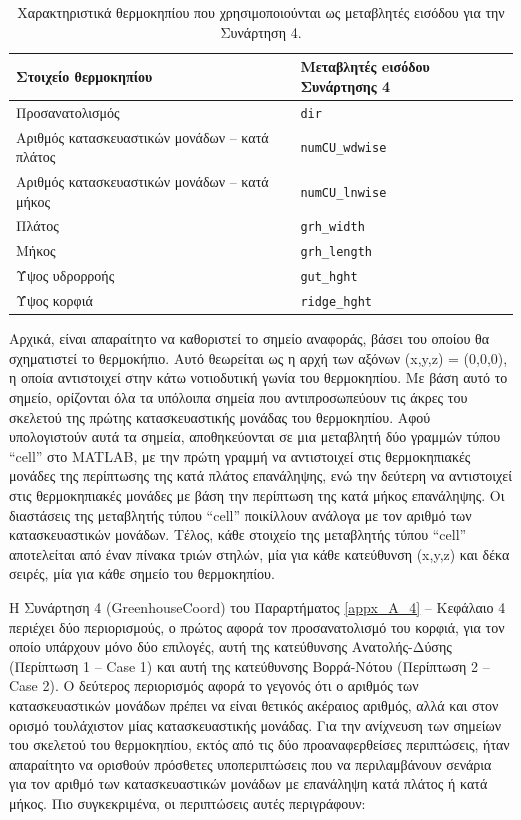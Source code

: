 \documentclass[12pt, a4paper]{report} %
\newcommand{\english}{\foreignlanguage{english}}
\begin{document}
\begin{table}[ht]
    \centering
    \caption{Χαρακτηριστικά θερμοκηπίου που χρησιμοποιούνται ως μεταβλητές εισόδου για την Συνάρτηση 4.}\label{tab_fnc_4_inputs} 
        \begin{tabular}{>{\centering\arraybackslash}m{7.5cm} >{\centering\arraybackslash}m{7.5cm}}
        \toprule
        \textbf{Στοιχείο θερμοκηπίου} & \textbf{Mεταβλητές eισόδου Συνάρτησης 4} \\
        \midrule
        Προσανατολισμός & \texttt{\english{dir}} \\
        Αριθμός κατασκευαστικών μονάδων – κατά πλάτος & \texttt{\english{numCU\_wdwise}} \\ 
        Αριθμός κατασκευαστικών μονάδων – κατά μήκος & \texttt{\english{numCU\_lnwise}} \\
        Πλάτος & \texttt{\english{grh\_width}} \\
        Μήκος & \texttt{\english{grh\_length}} \\ 
        Ύψος υδρορροής & \texttt{\english{gut\_hght}} \\
        Ύψος κορφιά & \texttt{\english{ridge\_hght}} \\
        \bottomrule
    \end{tabular}
\end{table}

Αρχικά, είναι απαραίτητο να καθοριστεί το σημείο αναφοράς, βάσει του οποίου θα σχηματιστεί το θερμοκήπιο. Αυτό θεωρείται 
ως η αρχή των αξόνων \english{(x,y,z)} = (0,0,0), η οποία αντιστοιχεί στην κάτω νοτιοδυτική γωνία του θερμοκηπίου. Με 
βάση αυτό το σημείο, ορίζονται όλα τα υπόλοιπα σημεία που αντιπροσωπεύουν τις άκρες του σκελετού της πρώτης 
κατασκευαστικής μονάδας του θερμοκηπίου. Αφού υπολογιστούν αυτά τα σημεία, αποθηκεύονται σε μια μεταβλητή δύο γραμμών 
τύπου “\english{cell}” στο \english{MATLAB}, με την πρώτη γραμμή να αντιστοιχεί στις θερμοκηπιακές μονάδες της περίπτωσης 
της κατά πλάτος επανάληψης, ενώ την δεύτερη να αντιστοιχεί στις θερμοκηπιακές μονάδες με βάση την περίπτωση της κατά 
μήκος επανάληψης. Οι διαστάσεις της μεταβλητής τύπου “\english{cell}” ποικίλλουν ανάλογα με τον αριθμό των κατασκευαστικών 
μονάδων. Τέλος, κάθε στοιχείο της μεταβλητής τύπου “\english{cell}” αποτελείται από έναν πίνακα τριών στηλών, μία για 
κάθε κατεύθυνση \english{(x,y,z)} και δέκα σειρές, μία για κάθε σημείο του θερμοκηπίου.

Η Συνάρτηση 4 (\english{GreenhouseCoord}) του Παραρτήματος \ref{appx_A_4} – Κεφάλαιο 4 περιέχει δύο περιορισμούς, ο πρώτος 
αφορά τον προσανατολισμό του κορφιά, για τον οποίο υπάρχουν μόνο δύο επιλογές, αυτή της κατεύθυνσης Ανατολής-Δύσης (Περίπτωση 1 – 
\english{Case} 1) και αυτή της κατεύθυνσης Βορρά-Νότου (Περίπτωση 2 – \english{Case} 2). Ο δεύτερος περιορισμός αφορά το 
γεγονός ότι ο αριθμός των κατασκευαστικών μονάδων πρέπει να είναι θετικός ακέραιος αριθμός, αλλά και στον ορισμό 
τουλάχιστον μίας κατασκευαστικής μονάδας. Για την ανίχνευση των σημείων του σκελετού του θερμοκηπίου, εκτός από τις δύο 
προαναφερθείσες περιπτώσεις, ήταν απαραίτητο να ορισθούν πρόσθετες υποπεριπτώσεις που να περιλαμβάνουν σενάρια για τον 
αριθμό των κατασκευαστικών μονάδων με επανάληψη κατά πλάτος ή κατά μήκος. Πιο συγκεκριμένα, οι περιπτώσεις αυτές 
περιγράφουν:
\end{document}
